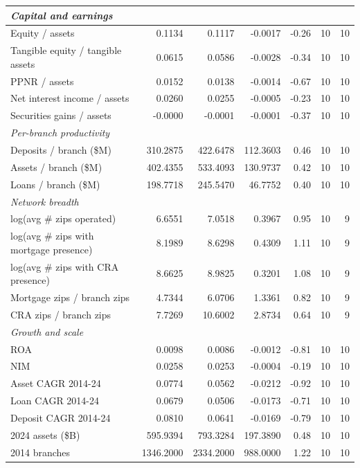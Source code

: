 \begin{tabular}{lrrrrrr}
\midrule
\multicolumn{7}{l}{\emph{Capital and earnings}} \\
\midrule
Equity / assets & 0.1134 & 0.1117 & -0.0017 & -0.26 & 10 & 10 \\
Tangible equity / tangible assets & 0.0615 & 0.0586 & -0.0028 & -0.34 & 10 & 10 \\
PPNR / assets & 0.0152 & 0.0138 & -0.0014 & -0.67 & 10 & 10 \\
Net interest income / assets & 0.0260 & 0.0255 & -0.0005 & -0.23 & 10 & 10 \\
Securities gains / assets & -0.0000 & -0.0001 & -0.0001 & -0.37 & 10 & 10 \\
\midrule
\multicolumn{7}{l}{\emph{Per-branch productivity}} \\
\midrule
Deposits / branch (\$M) & 310.2875 & 422.6478 & 112.3603 & 0.46 & 10 & 10 \\
Assets / branch (\$M) & 402.4355 & 533.4093 & 130.9737 & 0.42 & 10 & 10 \\
Loans / branch (\$M) & 198.7718 & 245.5470 & 46.7752 & 0.40 & 10 & 10 \\
\midrule
\multicolumn{7}{l}{\emph{Network breadth}} \\
\midrule
log(avg \# zips operated) & 6.6551 & 7.0518 & 0.3967 & 0.95 & 10 & 9 \\
log(avg \# zips with mortgage presence) & 8.1989 & 8.6298 & 0.4309 & 1.11 & 10 & 9 \\
log(avg \# zips with CRA presence) & 8.6625 & 8.9825 & 0.3201 & 1.08 & 10 & 9 \\
Mortgage zips / branch zips & 4.7344 & 6.0706 & 1.3361 & 0.82 & 10 & 9 \\
CRA zips / branch zips & 7.7269 & 10.6002 & 2.8734 & 0.64 & 10 & 9 \\
\midrule
\multicolumn{7}{l}{\emph{Growth and scale}} \\
\midrule
ROA & 0.0098 & 0.0086 & -0.0012 & -0.81 & 10 & 10 \\
NIM & 0.0258 & 0.0253 & -0.0004 & -0.19 & 10 & 10 \\
Asset CAGR 2014-24 & 0.0774 & 0.0562 & -0.0212 & -0.92 & 10 & 10 \\
Loan CAGR 2014-24 & 0.0679 & 0.0506 & -0.0173 & -0.71 & 10 & 10 \\
Deposit CAGR 2014-24 & 0.0810 & 0.0641 & -0.0169 & -0.79 & 10 & 10 \\
2024 assets (\$B) & 595.9394 & 793.3284 & 197.3890 & 0.48 & 10 & 10 \\
2014 branches & 1346.2000 & 2334.2000 & 988.0000 & 1.22 & 10 & 10 \\

\end{tabular}
